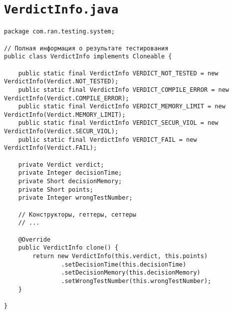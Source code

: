 \section*{\texttt{VerdictInfo.java}}
\begin{verbatim}
package com.ran.testing.system;

// Полная информация о результате тестирования
public class VerdictInfo implements Cloneable {

    public static final VerdictInfo VERDICT_NOT_TESTED = new VerdictInfo(Verdict.NOT_TESTED);
    public static final VerdictInfo VERDICT_COMPILE_ERROR = new VerdictInfo(Verdict.COMPILE_ERROR);
    public static final VerdictInfo VERDICT_MEMORY_LIMIT = new VerdictInfo(Verdict.MEMORY_LIMIT);
    public static final VerdictInfo VERDICT_SECUR_VIOL = new VerdictInfo(Verdict.SECUR_VIOL);
    public static final VerdictInfo VERDICT_FAIL = new VerdictInfo(Verdict.FAIL);

    private Verdict verdict;
    private Integer decisionTime;
    private Short decisionMemory;
    private Short points;
    private Integer wrongTestNumber;

    // Конструкторы, геттеры, сеттеры
    // ...

    @Override
    public VerdictInfo clone() {
        return new VerdictInfo(this.verdict, this.points)
                .setDecisionTime(this.decisionTime)
                .setDecisionMemory(this.decisionMemory)
                .setWrongTestNumber(this.wrongTestNumber);
    }

}
\end{verbatim}

